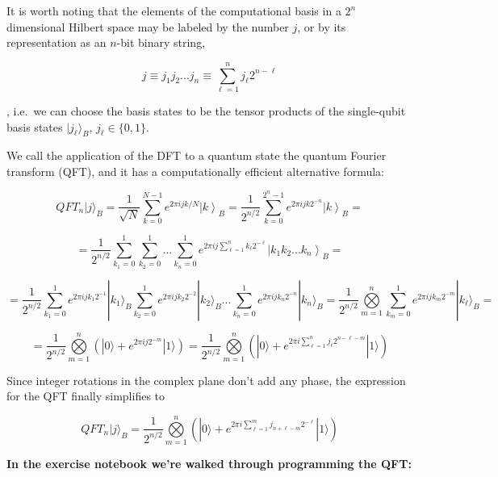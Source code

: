 \documentclass[11pt,dvipsnames]{article}
\begin{document}
It is worth noting that the elements of the computational basis in a
\(2^n\) dimensional Hilbert space may be labeled by the number \(j\), or
by its representation as an \(n\)-bit binary string,

\[
j \equiv j_1 j_2 ... j_n \equiv \sum\limits_{\ell=1}^{n} j_\ell 2^{n-\ell}
\]

, i.e.~we can choose the basis states to be the tensor products of the
single-qubit basis states \(|j_\ell\rangle_B\), \(j_\ell\in\{0,1\}\).

We call the application of the DFT to a quantum state the quantum
Fourier transform (QFT), and it has a computationally efficient
alternative formula:

\[
QFT_n |j\rangle_{B} = \frac{1}{\sqrt{N}}\sum^{N-1}_{k=0} e^{2\pi i j k /N}\left|k\right\rangle_{B} = 
\frac{1}{2^{n/2}}\sum^{2^n-1}_{k=0} e^{2\pi i j k 2^{-n}}\left|k\right\rangle_{B} = 
\]

\[
= \frac{1}{2^{n/2}}\sum^{1}_{k_1=0}\sum^{1}_{k_2=0}...\sum^{1}_{k_n=0}
e^{2\pi i j \sum\limits_{\ell=1}^{n} k_\ell 2^{-\ell}}\left|k_1 k_2 ... k_n\right\rangle_{B} =
\]

\[
= \frac{1}{2^{n/2}}\sum^{1}_{k_1=0}e^{2\pi i j k_1 2^{-1}}|k_1\rangle_B
\sum^{1}_{k_2=0}e^{2\pi i j k_2 2^{-2}}|k_2\rangle_B... 
\sum^{1}_{k_n=0}e^{2\pi i j k_n 2^{-n}}|k_n\rangle_B = 
\frac{1}{2^{n/2}} \bigotimes\limits_{m=1}^{n}\sum\limits_{k_m=0}^1 e^{2\pi i j k_m 2^{-m}}|k_\ell\rangle_B = 
\]

\[
= \frac{1}{2^{n/2}} \bigotimes\limits_{m=1}^{n}\left(|0\rangle + e^{2\pi i j 2^{-m}}|1\rangle \right) = 
\frac{1}{2^{n/2}} \bigotimes\limits_{m=1}^{n}\left(|0\rangle + e^{2\pi i \sum\limits_{\ell=1}^n j_\ell 2^{n-\ell-m}}|1\rangle \right) 
\]

Since integer rotations in the complex plane don't add any phase, the
expression for the QFT finally simplifies to

\[
QFT_n |j\rangle_{B} = \frac{1}{2^{n/2}} \bigotimes\limits_{m=1}^{n}\left(|0\rangle + e^{2\pi i \sum\limits_{\ell=1}^{m} j_{n+\ell-m} 2^{-\ell}}|1\rangle \right) 
\]

\textbf{In the exercise notebook we're walked through programming the
QFT:}
\end{document}
